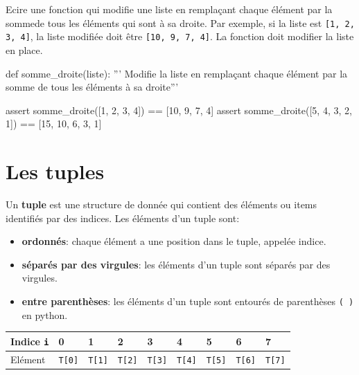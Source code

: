 		
\begin{exercice_cours}{}

	Ecire une fonction qui modifie une liste en remplaçant chaque élément par la sommede tous les éléments qui sont à sa droite. Par exemple, si la liste est \verb|[1, 2, 3, 4]|, la liste modifiée doit être \verb|[10, 9, 7, 4]|. La fonction doit modifier la liste en place.

\begin{CodePythontexAlt}[TaillePolice=\normalsize, Largeur=1\linewidth,Centre,PremLigne=1, Lignes=false]{}
def somme_droite(liste):
	''' Modifie la liste en remplaçant chaque élément par la somme de tous 
	les éléments à sa droite'''











assert somme_droite([1, 2, 3, 4]) == [10, 9, 7, 4]
assert somme_droite([5, 4, 3, 2, 1]) == [15, 10, 6, 3, 1]
\end{CodePythontexAlt}
\end{exercice_cours}

		\section{Les tuples}

		\begin{definition}[Les tuples]{}
		Un \textbf{tuple} est une structure de donnée qui contient des éléments ou items identifiés par des indices.	
		Les éléments d'un tuple sont:
\begin{itemize}
\item \textbf{ordonnés}: chaque élément a une position dans le tuple, appelée indice.
\item \textbf{séparés par des virgules}: les éléments d'un tuple sont séparés par des virgules.
\item \textbf{entre parenthèses}: les éléments d'un tuple sont entourés de parenthèses \verb|( )| en python.
\end{itemize}
\medskip
\begin{tabular}{|p{2cm}|p{1cm}|p{1cm}|p{1cm}|p{1cm}|p{1cm}|p{1cm}|p{1cm}|p{1cm}|}
\hline
Indice \verb|i| & 0 & 1 & 2 & 3 & 4 & 5 & 6 & 7 \\ \hline
Elément	& \verb|T[0]| & \verb|T[1]| & \verb|T[2]| & \verb|T[3]| & \verb|T[4]| & \verb|T[5]| & \verb|T[6]| & \verb|T[7]| \\ \hline

\end{tabular}

			
		\end{definition}

